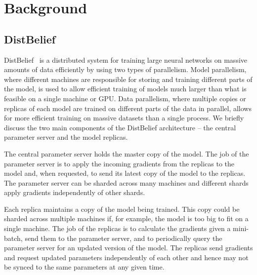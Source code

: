 \section{Background}
\subsection{DistBelief}
DistBelief~\cite{dean2012distbelief} is a distributed system for training large neural networks on massive amounts of data efficiently by using two types of parallelism.
Model parallelism, where different machines are responsible for storing and training different parts of the model, is used to allow efficient training of models much larger than what is feasible on a single machine or GPU.
Data parallelism, where multiple copies or replicas of each model are trained on different parts of the data in parallel, allows for more efficient training on massive datasets than a single process.
We briefly discuss the two main components of the DistBelief architecture -- the central parameter server and the model replicas.

The central parameter server holds the master copy of the model. The job of the parameter server is to apply the incoming gradients from the replicas to the model and, when requested, to send its latest copy of the model to the replicas. The parameter server can be sharded across many machines and different shards apply gradients independently of other shards.

Each replica maintains a copy of the model being trained. This copy could be sharded across multiple machines if, for example, the model is too big to fit on a single machine. The job of the replicas is to calculate the gradients given a mini-batch, send them to the parameter server, and to periodically query the parameter server for an updated version of the model. The replicas send gradients and request updated parameters independently of each other and hence may not be synced to the same parameters at any given time.